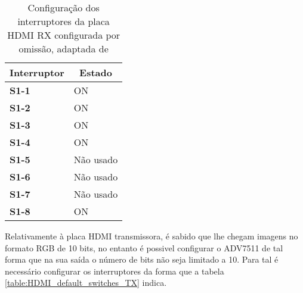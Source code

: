 \begin{table}[h!]
	\centering

		\begin{tabular}{@{}ll@{}}
			\toprule
			\multicolumn{1}{c}{\textbf{Interruptor}} & \multicolumn{1}{c}{\textbf{Estado}} \\ \midrule
			\textbf{S1-1}                            & ON                                  \\
			\textbf{S1-2}                            & ON                                  \\
			\textbf{S1-3}                            & ON                                  \\
			\textbf{S1-4}                            & ON                                  \\
			\textbf{S1-5}                            & Não usado                           \\
			\textbf{S1-6}                            & Não usado                           \\
			\textbf{S1-7}                            & Não usado                           \\
			\textbf{S1-8}                            & ON                                  \\ \bottomrule
		\end{tabular}%
	
	\caption{Configuração dos interruptores da placa HDMI RX configurada por omissão, adaptada de \cite{R009}}
	\label{table:HDMI_default_switches_RX}
\end{table}

Relativamente à placa HDMI transmissora, é sabido que lhe chegam imagens no formato RGB de 10 bits, no entanto é possivel configurar o ADV7511 de tal forma que na sua saída o número de bits não seja limitado a 10. Para tal é necessário configurar os interruptores da forma que a tabela \ref{table:HDMI_default_switches_TX} indica.

